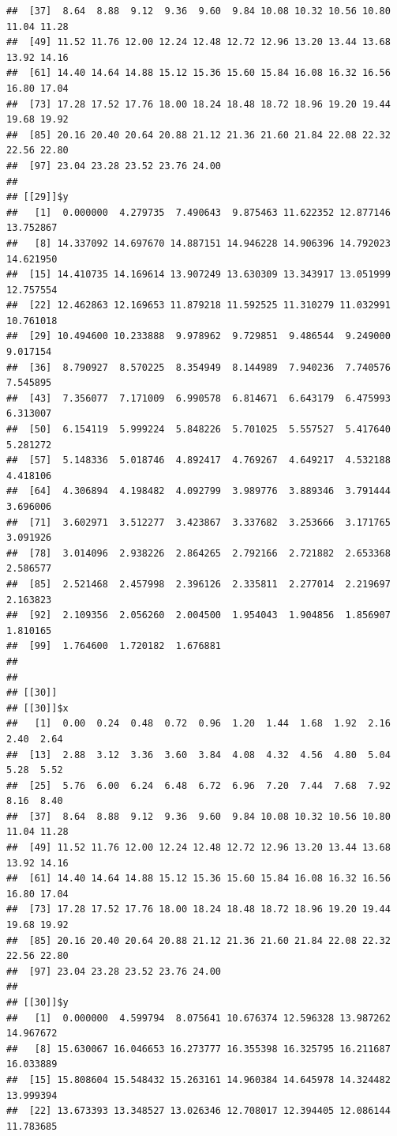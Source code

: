 \documentclass[
  ignorenonframetext,
]{beamer}
\begin{document}
\begin{frame}[fragile]{}
\begin{verbatim}
##  [37]  8.64  8.88  9.12  9.36  9.60  9.84 10.08 10.32 10.56 10.80 11.04 11.28
##  [49] 11.52 11.76 12.00 12.24 12.48 12.72 12.96 13.20 13.44 13.68 13.92 14.16
##  [61] 14.40 14.64 14.88 15.12 15.36 15.60 15.84 16.08 16.32 16.56 16.80 17.04
##  [73] 17.28 17.52 17.76 18.00 18.24 18.48 18.72 18.96 19.20 19.44 19.68 19.92
##  [85] 20.16 20.40 20.64 20.88 21.12 21.36 21.60 21.84 22.08 22.32 22.56 22.80
##  [97] 23.04 23.28 23.52 23.76 24.00
## 
## [[29]]$y
##   [1]  0.000000  4.279735  7.490643  9.875463 11.622352 12.877146 13.752867
##   [8] 14.337092 14.697670 14.887151 14.946228 14.906396 14.792023 14.621950
##  [15] 14.410735 14.169614 13.907249 13.630309 13.343917 13.051999 12.757554
##  [22] 12.462863 12.169653 11.879218 11.592525 11.310279 11.032991 10.761018
##  [29] 10.494600 10.233888  9.978962  9.729851  9.486544  9.249000  9.017154
##  [36]  8.790927  8.570225  8.354949  8.144989  7.940236  7.740576  7.545895
##  [43]  7.356077  7.171009  6.990578  6.814671  6.643179  6.475993  6.313007
##  [50]  6.154119  5.999224  5.848226  5.701025  5.557527  5.417640  5.281272
##  [57]  5.148336  5.018746  4.892417  4.769267  4.649217  4.532188  4.418106
##  [64]  4.306894  4.198482  4.092799  3.989776  3.889346  3.791444  3.696006
##  [71]  3.602971  3.512277  3.423867  3.337682  3.253666  3.171765  3.091926
##  [78]  3.014096  2.938226  2.864265  2.792166  2.721882  2.653368  2.586577
##  [85]  2.521468  2.457998  2.396126  2.335811  2.277014  2.219697  2.163823
##  [92]  2.109356  2.056260  2.004500  1.954043  1.904856  1.856907  1.810165
##  [99]  1.764600  1.720182  1.676881
## 
## 
## [[30]]
## [[30]]$x
##   [1]  0.00  0.24  0.48  0.72  0.96  1.20  1.44  1.68  1.92  2.16  2.40  2.64
##  [13]  2.88  3.12  3.36  3.60  3.84  4.08  4.32  4.56  4.80  5.04  5.28  5.52
##  [25]  5.76  6.00  6.24  6.48  6.72  6.96  7.20  7.44  7.68  7.92  8.16  8.40
##  [37]  8.64  8.88  9.12  9.36  9.60  9.84 10.08 10.32 10.56 10.80 11.04 11.28
##  [49] 11.52 11.76 12.00 12.24 12.48 12.72 12.96 13.20 13.44 13.68 13.92 14.16
##  [61] 14.40 14.64 14.88 15.12 15.36 15.60 15.84 16.08 16.32 16.56 16.80 17.04
##  [73] 17.28 17.52 17.76 18.00 18.24 18.48 18.72 18.96 19.20 19.44 19.68 19.92
##  [85] 20.16 20.40 20.64 20.88 21.12 21.36 21.60 21.84 22.08 22.32 22.56 22.80
##  [97] 23.04 23.28 23.52 23.76 24.00
## 
## [[30]]$y
##   [1]  0.000000  4.599794  8.075641 10.676374 12.596328 13.987262 14.967672
##   [8] 15.630067 16.046653 16.273777 16.355398 16.325795 16.211687 16.033889
##  [15] 15.808604 15.548432 15.263161 14.960384 14.645978 14.324482 13.999394
##  [22] 13.673393 13.348527 13.026346 12.708017 12.394405 12.086144 11.783685

\end{verbatim}
\end{frame}
\end{document}
